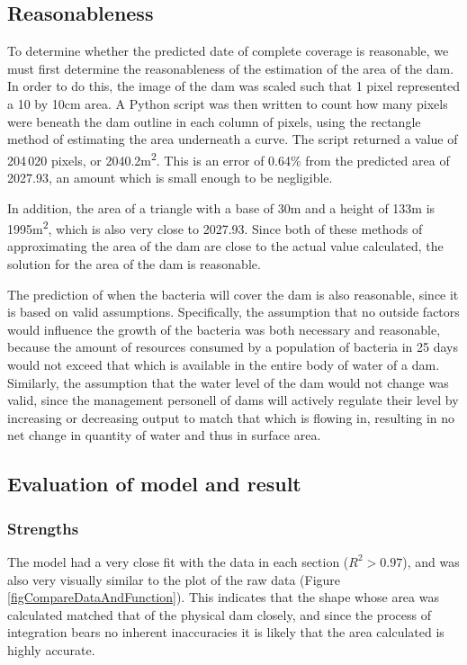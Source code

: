 \documentclass[a4paper]{article}
\theoremstyle{definition}
\begin{document}
    \subsection{Reasonableness}
        To determine whether the predicted date of complete coverage is reasonable, we must first determine the reasonableness of the estimation of the area of the dam. In order to do this, the image of the dam was scaled such that 1 pixel represented a 10 by 10cm area. A Python script was then written to count how many pixels were beneath the dam outline in each column of pixels, using the rectangle method of estimating the area underneath a curve. The script returned a value of 204\,020 pixels, or 2040.2m\textsuperscript{2}. This is an error of 0.64\% from the predicted area of 2027.93, an amount which is small enough to be negligible.

        In addition, the area of a triangle with a base of 30m and a height of 133m is 1995m\textsuperscript{2}, which is also very close to 2027.93. Since both of these methods of approximating the area of the dam are close to the actual value calculated, the solution for the area of the dam is reasonable.

        The prediction of when the bacteria will cover the dam is also reasonable, since it is based on valid assumptions. Specifically, the assumption that no outside factors would influence the growth of the bacteria was both necessary and reasonable, because the amount of resources consumed by a population of bacteria in 25 days would not exceed that which is available in the entire body of water of a dam. Similarly, the assumption that the water level of the dam would not change was valid, since the management personell of dams will actively regulate their level by increasing or decreasing output to match that which is flowing in, resulting in no net change in quantity of water and thus in surface area.


    \subsection{Evaluation of model and result}

        \subsubsection{Strengths}
            The model had a very close fit with the data in each section ($R^2 > 0.97$), and was also very visually similar to the plot of the raw data (Figure \ref{figCompareDataAndFunction}). This indicates that the shape whose area was calculated matched that of the physical dam closely, and since the process of integration bears no inherent inaccuracies it is likely that the area calculated is highly accurate.
\end{document}
